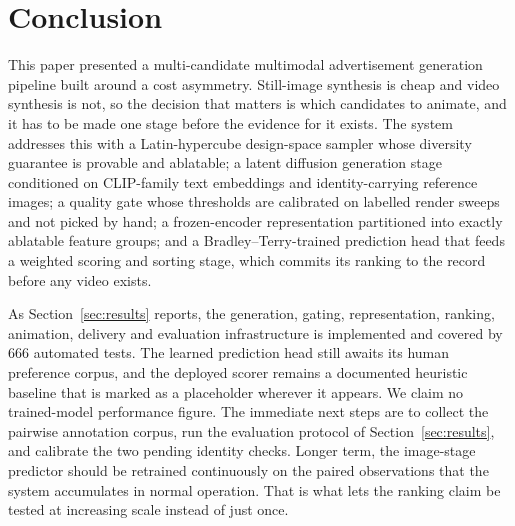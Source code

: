 \documentclass[conference]{IEEEtran}
\begin{document}
\section{Conclusion}
\label{sec:conclusion}

This paper presented a multi-candidate multimodal advertisement generation pipeline
built around a cost asymmetry. Still-image synthesis is cheap and video synthesis is
not, so the decision that matters is which candidates to animate, and it has to be
made one stage before the evidence for it exists. The system addresses this with a
Latin-hypercube design-space sampler whose diversity guarantee is provable and
ablatable; a latent diffusion generation stage conditioned on CLIP-family text
embeddings and identity-carrying reference images; a quality gate whose thresholds
are calibrated on labelled render sweeps and not picked by hand; a frozen-encoder
representation partitioned into exactly ablatable feature groups; and a
Bradley--Terry-trained prediction head that feeds a weighted scoring and sorting
stage, which commits its ranking to the record before any video exists.

As Section~\ref{sec:results} reports, the generation, gating, representation,
ranking, animation, delivery and evaluation infrastructure is implemented and
covered by 666 automated tests. The learned prediction head still awaits its human
preference corpus, and the deployed scorer remains a documented heuristic baseline
that is marked as a placeholder wherever it appears. We claim no trained-model
performance figure. The immediate next steps are to collect the pairwise annotation
corpus, run the evaluation protocol of Section~\ref{sec:results}, and calibrate the
two pending identity checks. Longer term, the image-stage predictor should be
retrained continuously on the paired observations that the system accumulates in
normal operation. That is what lets the ranking claim be tested at increasing scale
instead of just once.
\end{document}

